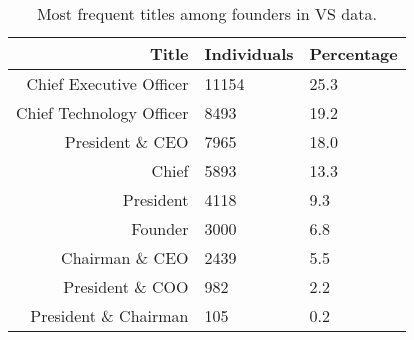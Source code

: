\begin{table}[!htb]
\caption{Most frequent titles among founders in VS data.}\label{table:VS_founder2_titlesSummaryTable}
\centering
\begingroup\normalsize
\begin{tabular}{rll}
  \toprule
Title & Individuals & Percentage \\ 
  \midrule
Chief Executive Officer & 11154 & 25.3 \\ 
  Chief Technology Officer & 8493 & 19.2 \\ 
  President \& CEO & 7965 & 18.0 \\ 
  Chief & 5893 & 13.3 \\ 
  President & 4118 & 9.3 \\ 
  Founder & 3000 & 6.8 \\ 
  Chairman \& CEO & 2439 & 5.5 \\ 
  President \& COO & 982 & 2.2 \\ 
  President \& Chairman & 105 & 0.2 \\ 
   \bottomrule
\end{tabular}
\endgroup


\end{table}
